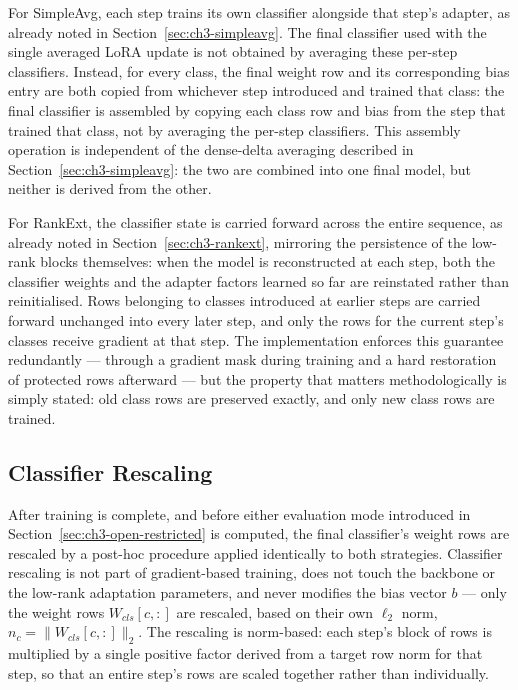 For SimpleAvg, each step trains its own classifier alongside that step's
adapter, as already noted in Section~\ref{sec:ch3-simpleavg}. The final classifier used with
the single averaged LoRA update is not obtained by averaging these
per-step classifiers. Instead, for every class, the final weight row and
its corresponding bias entry are both copied from whichever step
introduced and trained that class: the final classifier is assembled by
copying each class row and bias from the step that trained that class,
not by averaging the per-step classifiers. This assembly operation is
independent of the
dense-delta averaging described in Section~\ref{sec:ch3-simpleavg}: the two are combined into one
final model, but neither is derived from the other.

For RankExt, the classifier state is carried forward across the entire
sequence, as already noted in Section~\ref{sec:ch3-rankext}, mirroring the
persistence of the low-rank blocks themselves: when the model is
reconstructed at each step, both the classifier weights and the adapter
factors learned so far are reinstated rather than reinitialised. Rows belonging to classes
introduced at earlier steps are carried forward unchanged into every later
step, and only the rows for the current step's classes receive gradient at
that step. The implementation enforces this guarantee redundantly ---
through a gradient mask during training and a hard restoration of
protected rows afterward --- but the property that matters methodologically
is simply stated: old class rows are preserved exactly, and only new class
rows are trained.

\subsection{Classifier Rescaling}
\label{sec:ch3-calibration}

After training is complete, and before either evaluation mode introduced
in Section~\ref{sec:ch3-open-restricted} is computed, the final classifier's weight rows are
rescaled by a post-hoc procedure applied identically to both strategies.
Classifier rescaling is not part of gradient-based training, does not touch the
backbone or the low-rank adaptation parameters, and never modifies the
bias vector $b$ --- only the weight rows $W_{cls}[c,:]$ are rescaled, based on
their own $\ell_2$ norm, $n_c=\lVert W_{cls}[c,:]\rVert_2$. The rescaling is
norm-based: each step's block of rows is multiplied by a single positive
factor derived from a target row norm for that step, so that an entire
step's rows are scaled together rather than individually.

